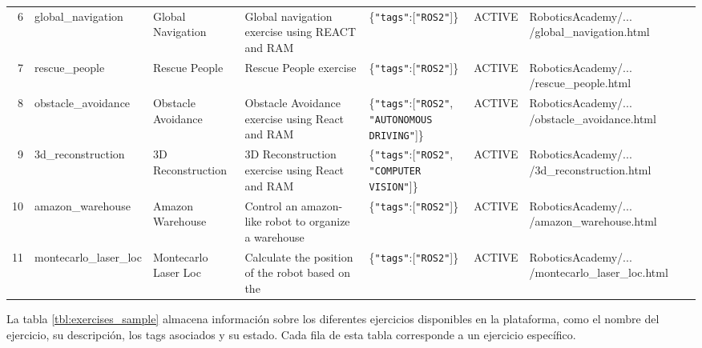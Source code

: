 \documentclass[a4paper, 12pt]{book}
\begin{document}
\begin{table}[!htb]
{\begin{tabular}{r l p{2cm} p{4cm} p{2.75cm} p{1.5cm} p{2.75cm}}
6  & global\_navigation     & Global Navigation      & Global navigation exercise using REACT and RAM                                                                                  & \{\texttt{"tags"}:[\texttt{"ROS2"}]\}                                  & ACTIVE         & RoboticsAcademy/... /global\_navigation.html    \\
7  & rescue\_people         & Rescue People          & Rescue People exercise                                                                                                          & \{\texttt{"tags"}:[\texttt{"ROS2"}]\}                                  & ACTIVE         & RoboticsAcademy/... /rescue\_people.html        \\
8  & obstacle\_avoidance    & Obstacle Avoidance     & Obstacle Avoidance exercise using React and RAM                                                                                 & \{\texttt{"tags"}:[\texttt{"ROS2"}, \texttt{"AUTONOMOUS DRIVING"}]\}    & ACTIVE         & RoboticsAcademy/... /obstacle\_avoidance.html   \\
9  & 3d\_reconstruction     & 3D Reconstruction      & 3D Reconstruction exercise using React and RAM                                                                                 & \{\texttt{"tags"}:[\texttt{"ROS2"}, \texttt{"COMPUTER VISION"}]\}       & ACTIVE         & RoboticsAcademy/... /3d\_reconstruction.html    \\
10 & amazon\_warehouse      & Amazon Warehouse       & Control an amazon-like robot to organize a warehouse                                                                            & \{\texttt{"tags"}:[\texttt{"ROS2"}]\}                                  & ACTIVE         & RoboticsAcademy/... /amazon\_warehouse.html     \\
11 & montecarlo\_laser\_loc & Montecarlo Laser Loc   & Calculate the position of the robot based on the                                                                                 & \{\texttt{"tags"}:[\texttt{"ROS2"}]\}                                  & ACTIVE         & RoboticsAcademy/... /montecarlo\_laser\_loc.html \\
\bottomrule
\end{tabular}
} %
\end{table}

La tabla \ref{tbl:exercises_sample} almacena información sobre los diferentes ejercicios disponibles en la plataforma, como el nombre del ejercicio, su descripción, los tags asociados y su estado. Cada fila de esta tabla corresponde a un ejercicio específico.
\end{document}
